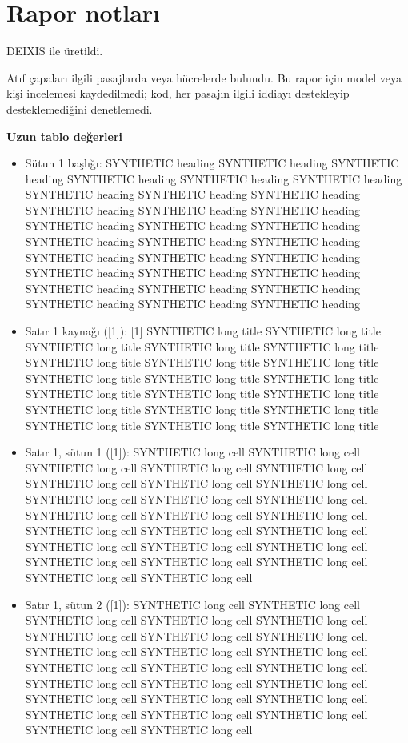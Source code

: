 \documentclass[journal]{IEEEtran}
\begin{document}
\section*{Rapor notları}

DEIXIS ile üretildi.

Atıf çapaları ilgili pasajlarda veya hücrelerde bulundu. Bu rapor için model veya kişi incelemesi kaydedilmedi; kod, her pasajın ilgili iddiayı destekleyip desteklemediğini denetlemedi.

\noindent\textbf{Uzun tablo değerleri}

\begin{itemize}
\item[1.] Sütun 1 başlığı: SYNTHETIC heading SYNTHETIC heading SYNTHETIC heading SYNTHETIC heading SYNTHETIC heading SYNTHETIC heading SYNTHETIC heading SYNTHETIC heading SYNTHETIC heading SYNTHETIC heading SYNTHETIC heading SYNTHETIC heading SYNTHETIC heading SYNTHETIC heading SYNTHETIC heading SYNTHETIC heading SYNTHETIC heading SYNTHETIC heading SYNTHETIC heading SYNTHETIC heading SYNTHETIC heading SYNTHETIC heading SYNTHETIC heading SYNTHETIC heading SYNTHETIC heading SYNTHETIC heading SYNTHETIC heading SYNTHETIC heading SYNTHETIC heading SYNTHETIC heading
\item[2.] Satır 1 kaynağı ([1]): [1] SYNTHETIC long title SYNTHETIC long title SYNTHETIC long title SYNTHETIC long title SYNTHETIC long title SYNTHETIC long title SYNTHETIC long title SYNTHETIC long title SYNTHETIC long title SYNTHETIC long title SYNTHETIC long title SYNTHETIC long title SYNTHETIC long title SYNTHETIC long title SYNTHETIC long title SYNTHETIC long title SYNTHETIC long title SYNTHETIC long title SYNTHETIC long title SYNTHETIC long title
\item[3.] Satır 1, sütun 1 ([1]): SYNTHETIC long cell SYNTHETIC long cell SYNTHETIC long cell SYNTHETIC long cell SYNTHETIC long cell SYNTHETIC long cell SYNTHETIC long cell SYNTHETIC long cell SYNTHETIC long cell SYNTHETIC long cell SYNTHETIC long cell SYNTHETIC long cell SYNTHETIC long cell SYNTHETIC long cell SYNTHETIC long cell SYNTHETIC long cell SYNTHETIC long cell SYNTHETIC long cell SYNTHETIC long cell SYNTHETIC long cell SYNTHETIC long cell SYNTHETIC long cell SYNTHETIC long cell SYNTHETIC long cell SYNTHETIC long cell
\item[4.] Satır 1, sütun 2 ([1]): SYNTHETIC long cell SYNTHETIC long cell SYNTHETIC long cell SYNTHETIC long cell SYNTHETIC long cell SYNTHETIC long cell SYNTHETIC long cell SYNTHETIC long cell SYNTHETIC long cell SYNTHETIC long cell SYNTHETIC long cell SYNTHETIC long cell SYNTHETIC long cell SYNTHETIC long cell SYNTHETIC long cell SYNTHETIC long cell SYNTHETIC long cell SYNTHETIC long cell SYNTHETIC long cell SYNTHETIC long cell SYNTHETIC long cell SYNTHETIC long cell SYNTHETIC long cell SYNTHETIC long cell SYNTHETIC long cell

\end{itemize}
\end{document}
